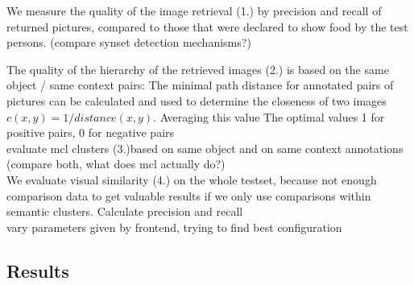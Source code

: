 We measure the quality of the image retrieval (1.) by precision and recall of returned pictures, compared to those that were declared to show food by the test persons. (compare synset detection mechanisms?) 

The quality of the hierarchy of the retrieved images (2.) is based on the same object / same context pairs: The  minimal path distance for annotated pairs of pictures can be calculated and used to determine the closeness of two images $c(x,y) = 1/distance(x,y)$. Averaging this value The optimal values 1 for positive pairs, 0 for negative pairs\\
evaluate mcl clusters (3.)based on same object and on same context annotations (compare both, what does mcl actually do?) \\

We evaluate visual similarity (4.) on the whole testset, because not enough comparison data to get valuable results if we only use comparisons within semantic clusters. Calculate precision and recall\\

vary parameters given by frontend, trying to find best configuration \\

\subsection{Results}

